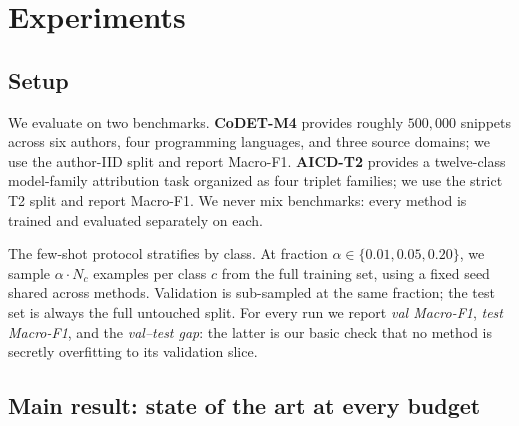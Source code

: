 ﻿\documentclass[11pt]{article}
\begin{document}
\section{Experiments}
\label{sec:exp}

\subsection{Setup}

We evaluate on two benchmarks. \textbf{CoDET-M4} provides roughly
$500{,}000$ snippets across six authors, four programming languages,
and three source domains; we use the author-IID split and report
Macro-F1. \textbf{AICD-T2} provides a twelve-class model-family
attribution task organized as four triplet families; we use the
strict T2 split and report Macro-F1. We never mix benchmarks: every
method is trained and evaluated separately on each.

The few-shot protocol stratifies by class. At fraction $\alpha
\in \{0.01, 0.05, 0.20\}$, we sample $\alpha \!\cdot\! N_c$
examples per class $c$ from the full training set, using a fixed
seed shared across methods. Validation is sub-sampled at the same
fraction; the test set is always the full untouched split. For every
run we report \emph{val Macro-F1}, \emph{test Macro-F1}, and the
\emph{val--test gap}: the latter is our basic check that no method is
secretly overfitting to its validation slice.

\subsection{Main result: state of the art at every budget}
\label{sec:main}
\end{document}
